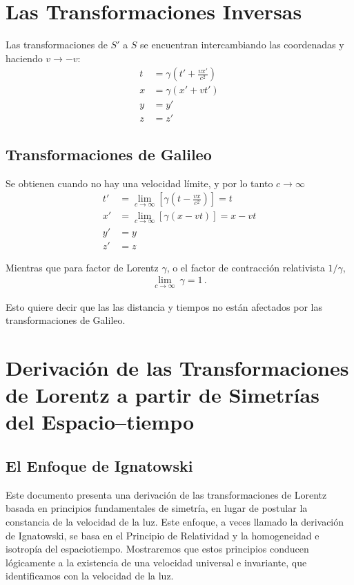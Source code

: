 \documentclass[11pt,a4paper]{article}
\begin{document}
\section{Las Transformaciones Inversas}
Las transformaciones de $S'$ a $S$ se encuentran intercambiando las coordenadas y haciendo $v \to -v$:
\[
\boxed{
\begin{aligned}
t &= \gamma \left( t' + \frac{vx'}{c^2} \right) \\
x &= \gamma (x' + vt') \\
y &= y' \\
z &= z'
\end{aligned}
}
\]

\subsection{Transformaciones de Galileo}
Se obtienen cuando no hay una velocidad límite, y por lo tanto $c\to \infty$
\begin{align*}
t' &= \lim_{c\to\infty}\left[\gamma \left( t - \frac{vx}{c^2} \right)\right] 
    = t\\
x' &= \lim_{c\to\infty}\left[\gamma (x - vt)\right]  = x - vt \\
y' &= y \\
z' &= z
\end{align*}

Mientras que para factor de Lorentz $\gamma$, o el factor de contracción relativista $1/\gamma$, 
\begin{align}
    \lim_{c\to\infty}\ \gamma = 1\,. 
\end{align}

Esto quiere decir que las las distancia y tiempos no están afectados por las transformaciones de Galileo.




\section{Derivación de las Transformaciones de Lorentz a partir de Simetrías del Espacio--tiempo}
\subsection{El Enfoque de Ignatowski}
Este documento presenta una derivación de las transformaciones de Lorentz basada en principios fundamentales de simetría, en lugar de postular la constancia de la velocidad de la luz. Este enfoque, a veces llamado la derivación de Ignatowski, se basa en el Principio de Relatividad y la homogeneidad e isotropía del espaciotiempo. Mostraremos que estos principios conducen lógicamente a la existencia de una velocidad universal e invariante, que identificamos con la velocidad de la luz.
\end{document}
